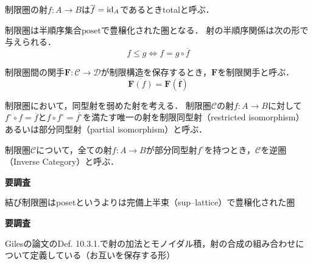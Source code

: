 \documentclass[type_judgement.tex]{subfiles}
\begin{document}
制限圏の射$f: A \rightarrow B$は$\overline{f} = \mathop{\mathrm{id}}\nolimits_A$であるときtotalと呼ぶ．

制限圏は半順序集合$\mathrm{poset}$で豊穣化された圏となる\cite[p.237]{cockett_restriction_2002}\cite[Lemma 1.6.3]{guo_products_2012}．
射の半順序関係は次の形で与えられる．
\begin{equation*}
  f \leq g \Leftrightarrow f = g \circ \overline{f}
\end{equation*}

\begin{defn}\cite[1.6.3 p.22]{guo_products_2012}
  制限圏間の関手$\mathbf{F}:\mathcal{C}\rightarrow\mathcal{D}$が制限構造を保存するとき，$\mathbf{F}$を制限関手と呼ぶ．
  \begin{equation*}
    \overline{\mathbf{F}(f)} = \mathbf{F(\overline{f})}
  \end{equation*}
\end{defn}

制限圏において，同型射を弱めた射を考える．
制限圏$\mathcal{C}$の射$f: A \rightarrow B$に対して$f^\circ \circ f = \overline{f}$と$f \circ f^\circ = \overline{f^\circ}$を満たす唯一の射を制限同型射（restricted isomorphism）あるいは部分同型射（partial isomorphism）と呼ぶ．

\begin{defn}\cite[section 2.3.2]{cockett_restriction_2002}\cite[Def. 3]{kaarsgaard_join_2017}
制限圏$\mathcal{C}$について，全ての射$f:A \rightarrow B$が部分同型射$f^\circ$を持つとき，$\mathcal{C}$を逆圏（Inverse Category）と呼ぶ．
\end{defn}

\begin{defn}{\bf 要調査}

  結び制限圏はposetというよりは完備上半束（sup--lattice）で豊穣化された圏
\end{defn}

\begin{defn}{\bf 要調査}
\end{defn}

Gilesの論文のDef. 10.3.1.で射の加法とモノイダル積，射の合成の組み合わせについて定義している（お互いを保存する形）
\end{document}
